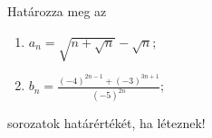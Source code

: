 \documentclass[11pt]{scrartcl}
\begin{document}
Határozza meg az
\begin{enumerate}
	\item \(\displaystyle
	      a_n = \sqrt{n + \sqrt{n}} - \sqrt{n};
	      \)

	\item \(\displaystyle
	      b_n = \frac{(-4)^{2n - 1} + (-3)^{3n + 1}}{(-5)^{2n}};
	      \)
\end{enumerate}
sorozatok határértékét, ha léteznek!
\end{document}
